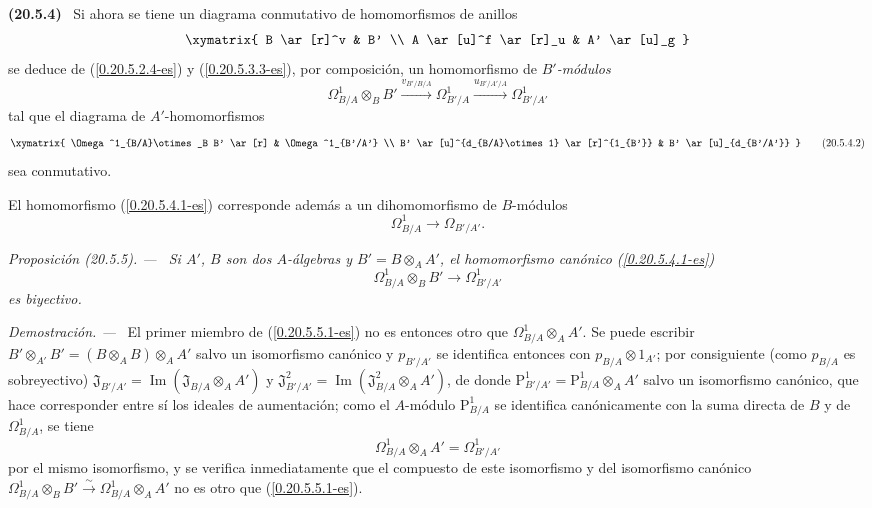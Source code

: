 \documentclass[10pt,oneside]{book}
\makeatletter
\newcommand{\sref}[1]{\textup{(\ref{#1})}}
\newcommand{\setmanualcurrentlabel}[1]{\def\@currentlabel{#1}}
\newcommand{\oldpage}[2][]{%
  \setcounter{footnote}{0}%
  \marginpar{\scriptsize\textbf{#1}~|~#2}\ignorespaces}
\newenvironment{env}[1][]{\setmanualcurrentlabel{#1}\par\medskip\noindent\textbf{(#1)}\ }{\par}
\newenvironment{proposition}[1][]{%
  \setmanualcurrentlabel{#1}\par\medskip\noindent\itshape Proposición (#1). ---\ }{\par}
\newenvironment{proof}{%
  \par\medskip\noindent\textit{Demostración. ---\ }}{\par}
\makeatother
\begin{document}
\begin{env}[20.5.4]
\label{0.20.5.4-es}
Si ahora se tiene un diagrama conmutativo de homomorfismos de anillos
\[
\xymatrix{
  B \ar[r]^v & B' \\
  A \ar[u]^f \ar[r]_u & A' \ar[u]_g
}
\]
se deduce de \sref{0.20.5.2.4-es} y \sref{0.20.5.3.3-es}, por composición,
un homomorfismo de \emph{$B'$-módulos}
\begin{equation}
\tag{20.5.4.1}
\label{0.20.5.4.1-es}
  \Omega^1_{B/A}\otimes_B B'
  \xrightarrow{v_{B'/B/A}}\Omega^1_{B'/A}
  \xrightarrow{u_{B'/A'/A}}\Omega^1_{B'/A'}
\end{equation}
tal que el diagrama de $A'$-homomorfismos
\[
\xymatrix{
  \Omega^1_{B/A}\otimes_B B' \ar[r] & \Omega^1_{B'/A'} \\
  B' \ar[u]^{d_{B/A}\otimes1} \ar[r]^{1_{B'}} &
  B' \ar[u]_{d_{B'/A'}}
}
\tag{20.5.4.2}
\label{0.20.5.4.2-es}
\]
sea conmutativo.

El homomorfismo \sref{0.20.5.4.1-es} corresponde además a un
dihomomorfismo de $B$-módulos
\begin{equation}
\tag{20.5.4.3}
\label{0.20.5.4.3-es}
  \Omega^1_{B/A}\to\Omega_{B'/A'}.
\end{equation}
\end{env}

\begin{proposition}[20.5.5]
\label{0.20.5.5-es}
Si $A'$, $B$ son dos $A$-álgebras y $B'=B\otimes_A A'$,
el homomorfismo canónico \textup{\sref{0.20.5.4.1-es}}
\begin{equation}
\tag{20.5.5.1}
\label{0.20.5.5.1-es}
  \Omega^1_{B/A}\otimes_B B'\to\Omega^1_{B'/A'}
\end{equation}
es biyectivo.
\end{proposition}

\begin{proof}
\oldpage[0\textsubscript{IV-1}]{131}
El primer miembro de \sref{0.20.5.5.1-es} no es entonces otro que
$\Omega^1_{B/A}\otimes_A A'$. Se puede escribir
$B'\otimes_{A'}B'=(B\otimes_A B)\otimes_A A'$ salvo un isomorfismo canónico
y $p_{B'/A'}$ se identifica entonces con
$p_{B/A}\otimes1_{A'}$; por consiguiente (como $p_{B/A}$ es sobreyectivo)
$\mathfrak{J}_{B'/A'}=\operatorname{Im}(\mathfrak{J}_{B/A}\otimes_A A')$
y
$\mathfrak{J}^2_{B'/A'}
=\operatorname{Im}(\mathfrak{J}^2_{B/A}\otimes_A A')$, de donde
$\mathrm{P}^1_{B'/A'}=\mathrm{P}^1_{B/A}\otimes_A A'$ salvo un isomorfismo
canónico, que hace corresponder entre sí los ideales de aumentación;
como el $A$-módulo $\mathrm{P}^1_{B/A}$ se identifica canónicamente con la
suma directa de $B$ y de $\Omega^1_{B/A}$, se tiene
\begin{equation}
\tag{20.5.5.2}
\label{0.20.5.5.2-es}
  \Omega^1_{B/A}\otimes_A A'=\Omega^1_{B'/A'}
\end{equation}
por el mismo isomorfismo, y se verifica inmediatamente que el compuesto de este
isomorfismo y del isomorfismo canónico
$\Omega^1_{B/A}\otimes_B B'\xrightarrow{\sim}
\Omega^1_{B/A}\otimes_A A'$ no es otro que \sref{0.20.5.5.1-es}.
\end{proof}
\end{document}
